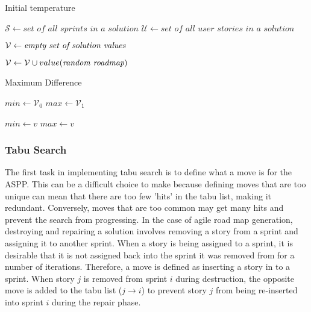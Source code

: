 \begin{algorithm}[H]
\caption{Initial temperature}\label{annealing_initial_temp}
\begin{algorithmic}[1]
    \State $\mathcal{S} \gets \textit{set of all sprints in a solution}$
    \State $\mathcal{U} \gets \textit{set of all user stories in a solution}$
    
        \State $\mathcal{V} \gets \emph{empty set of solution values}$
        
            \State $\mathcal{V} \gets \mathcal{V} \cup value(\emph{random roadmap})$
        \EndFor
        
        \State {}
    \EndProcedure
\end{algorithmic}
\end{algorithm}

\begin{algorithm}[H]
\caption{Maximum Difference}\label{max_difference}
\begin{algorithmic}[1]
        \State $min \gets \mathcal{V}_0$
        \State $max \gets \mathcal{V}_1$
    
                \State $min \gets v$
            \Else{}
                    \State $max \gets v$
                \EndIf
            \EndIf
        \EndFor
        
        \State {}
    \EndProcedure
\end{algorithmic}
\end{algorithm}

\subsubsection{Tabu Search} \label{tabu}

The first task in implementing tabu search is to define what a move is for the ASPP. This can be a difficult choice to make because defining moves that are too unique can mean that there are too few 'hits' in the tabu list, making it redundant. Conversely, moves that are too common may get many hits and prevent the search from progressing. In the case of agile road map generation, destroying and repairing a solution involves removing a story from a sprint and assigning it to another sprint. When a story is being assigned to a sprint, it is desirable that it is not assigned back into the sprint it was removed from for a number of iterations. Therefore, a move is defined as inserting a story in to a sprint. When story $j$ is removed from sprint $i$ during destruction, the opposite move is added to the tabu list ($j \rightarrow i$) to prevent story $j$ from being re-inserted into sprint $i$ during the repair phase.


